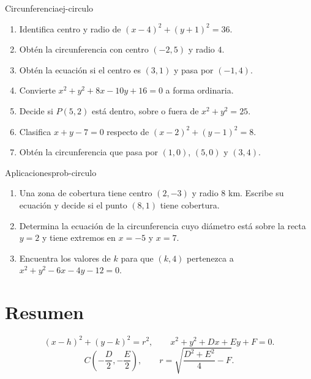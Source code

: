 \begin{exercise}{Circunferencia}{ej-circulo}
\begin{enumerate}
  \item Identifica centro y radio de $(x-4)^2+(y+1)^2=36$.
  \item Obtén la circunferencia con centro $(-2,5)$ y radio $4$.
  \item Obtén la ecuación si el centro es $(3,1)$ y pasa por $(-1,4)$.
  \item Convierte $x^2+y^2+8x-10y+16=0$ a forma ordinaria.
  \item Decide si $P(5,2)$ está dentro, sobre o fuera de $x^2+y^2=25$.
  \item Clasifica $x+y-7=0$ respecto de $(x-2)^2+(y-1)^2=8$.
  \item Obtén la circunferencia que pasa por $(1,0)$, $(5,0)$ y $(3,4)$.
\end{enumerate}
\end{exercise}

\begin{problem}{Aplicaciones}{prob-circulo}
\begin{enumerate}
  \item Una zona de cobertura tiene centro $(2,-3)$ y radio $8$ km. Escribe
  su ecuación y decide si el punto $(8,1)$ tiene cobertura.
  \item Determina la ecuación de la circunferencia cuyo diámetro está sobre
  la recta $y=2$ y tiene extremos en $x=-5$ y $x=7$.
  \item Encuentra los valores de $k$ para que $(k,4)$ pertenezca a
  $x^2+y^2-6x-4y-12=0$.
\end{enumerate}
\end{problem}

\section*{Resumen}
\begin{properties}
\[
(x-h)^2+(y-k)^2=r^2,
\qquad
x^2+y^2+Dx+Ey+F=0.
\]
\[
C\left(-\frac D2,-\frac E2\right),
\qquad
r=\sqrt{\frac{D^2+E^2}{4}-F}.
\]
\end{properties}

